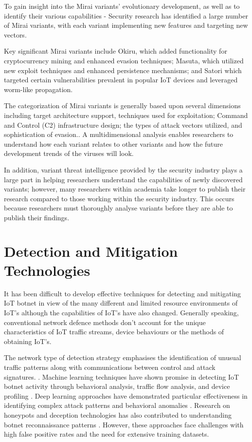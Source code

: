 \documentclass[12pt,letterpaper]{report}
\begin{document}
To gain insight into the Mirai variants’ evolutionary development, as well as to identify their various capabilities - Security research has identified a large number of Mirai variants, with each variant implementing new features and targeting new vectors.

Key significant Mirai variants include Okiru, which added functionality for cryptocurrency mining and enhanced evasion techniques; Masuta, which utilized new exploit techniques and enhanced persistence mechanisms; and Satori which targeted certain vulnerabilities prevalent in popular IoT devices and leveraged worm-like propagation.

The categorization of Mirai variants is generally based upon several dimensions including target architecture support, techniques used for exploitation; Command and Control (C2) infrastructure design; the types of attack vectors utilized, and sophistication of evasion.\cite{kolias2017ddos}. A multidimensional analysis enables researchers to understand how each variant relates to other variants and how the future development trends of the viruses will look.

In addition, variant threat intelligence provided by the security industry plays a large part in helping researchers understand the capabilities of newly discovered variants; however, many researchers within academia take longer to publish their research compared to those working within the security industry. This occurs because researchers must thoroughly analyse variants before they are able to publish their findings.

\section{Detection and Mitigation Technologies}

It has been difficult to develop effective techniques for detecting and mitigating IoT botnet in view of the many different and limited resource environments of IoT's although the capabilities of IoT's have also changed. Generally speaking, conventional network defence methods don't account for the unique characteristics of IoT traffic streams, device behaviours or the methods of obtaining IoT's.


The network type of detection strategy emphasises the identification of unusual traffic patterns along with communications between control and attack signatures. \cite{silva2013botnets}. Machine learning techniques have shown promise in detecting IoT botnet activity through behavioral analysis, traffic flow analysis, and device profiling \cite{meidan2018n, nisioti2021honeypots}. Deep learning approaches have demonstrated particular effectiveness in identifying complex attack patterns and behavioral anomalies \cite{roopak2019deep}. Research on honeypots and deception technologies has also contributed to understanding botnet reconnaissance patterns \cite{parmisano2022mozi}. However, these approaches face challenges with high false positive rates and the need for extensive training datasets.
\end{document}
